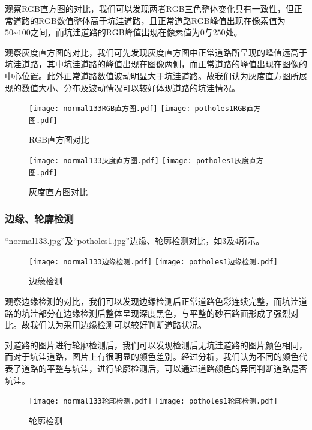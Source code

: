 \documentclass{MathorCupmodeling}
\begin{document}
	观察RGB直方图的对比，我们可以发现两者RGB三色整体变化具有一致性，但正常道路的RGB数值整体高于坑洼道路，且正常道路RGB峰值出现在像素值为$50\text{\textasciitilde}100$之间，而坑洼道路的RGB峰值出现在像素值为$0$与$250$处。

	观察灰度直方图的对比，我们可先发现灰度直方图中正常道路所呈现的峰值远高于坑洼道路，其中坑洼道路的峰值出现在图像两侧，而正常道路的峰值出现在图像的中心位置。此外正常道路数值波动明显大于坑洼道路。故我们认为灰度直方图所展现的数值大小、分布及波动情况可以较好体现道路的坑洼情况。
	\begin{figure}[H]
		\centering
		\texttt{[image: normal133RGB直方图.pdf]}
		\hspace{0.3in}
		\texttt{[image: potholes1RGB直方图.pdf]}
		\caption{RGB直方图对比}
		\label{fig:RGB对比}
	\end{figure}
	\begin{figure}[H]
		\centering
		\texttt{[image: normal133灰度直方图.pdf]}
		\hspace{0.3in}
		\texttt{[image: potholes1灰度直方图.pdf]}
		\caption{灰度直方图对比}
		\label{fig:灰度对比}
	\end{figure}
	
	\subsubsection{边缘、轮廓检测}
	“normal133.jpg”及“potholes1.jpg”边缘、轮廓检测对比，如\textcolor{blue}{\cref{fig:边缘检测}}及\textcolor{blue}{\cref{fig:轮廓检测}}所示。
	\begin{figure}[H]
		\centering
		\texttt{[image: normal133边缘检测.pdf]}
		\hspace{0.3in}
		\texttt{[image: potholes1边缘检测.pdf]}
		\caption{边缘检测}
		\label{fig:边缘检测}
	\end{figure}
	观察边缘检测的对比，我们可以发现边缘检测后正常道路色彩连续完整，而坑洼道路的坑洼部分在边缘检测后整体呈现深度黑色，与平整的砂石路面形成了强烈对比。故我们认为采用边缘检测可以较好判断道路状况。

	对道路的图片进行轮廓检测后，我们可以发现检测后无坑洼道路的图片颜色相同，而对于坑洼道路，图片上有很明显的颜色差别。经过分析，我们认为不同的颜色代表了道路的平整与坑洼，进行轮廓检测后，可以通过道路颜色的异同判断道路是否坑洼。
	\begin{figure}[H]
		\centering
		\texttt{[image: normal133轮廓检测.pdf]}
		\hspace{0.3in}
		\texttt{[image: potholes1轮廓检测.pdf]}
		\caption{轮廓检测}
		\label{fig:轮廓检测}
	\end{figure}
\end{document}
